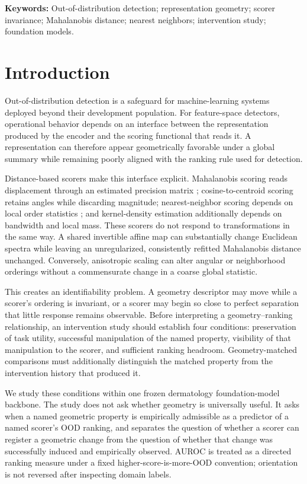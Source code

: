 \documentclass[11pt,a4paper]{article}
\begin{document}
\noindent\textbf{Keywords:} Out-of-distribution detection; representation geometry; scorer invariance; Mahalanobis distance; nearest neighbors; intervention study; foundation models.

\section{Introduction}
Out-of-distribution detection is a safeguard for machine-learning systems deployed beyond their development population. For feature-space detectors, operational behavior depends on an interface between the representation produced by the encoder and the scoring functional that reads it. A representation can therefore appear geometrically favorable under a global summary while remaining poorly aligned with the ranking rule used for detection.

Distance-based scorers make this interface explicit. Mahalanobis scoring reads displacement through an estimated precision matrix \cite{b1}; cosine-to-centroid scoring retains angles while discarding magnitude; nearest-neighbor scoring depends on local order statistics \cite{b2}; and kernel-density estimation additionally depends on bandwidth and local mass. These scorers do not respond to transformations in the same way. A shared invertible affine map can substantially change Euclidean spectra while leaving an unregularized, consistently refitted Mahalanobis distance unchanged. Conversely, anisotropic scaling can alter angular or neighborhood orderings without a commensurate change in a coarse global statistic.

This creates an identifiability problem. A geometry descriptor may move while a scorer's ordering is invariant, or a scorer may begin so close to perfect separation that little response remains observable. Before interpreting a geometry--ranking relationship, an intervention study should establish four conditions: preservation of task utility, successful manipulation of the named property, visibility of that manipulation to the scorer, and sufficient ranking headroom. Geometry-matched comparisons must additionally distinguish the matched property from the intervention history that produced it.

We study these conditions within one frozen dermatology foundation-model backbone. The study does not ask whether geometry is universally useful. It asks when a named geometric property is empirically admissible as a predictor of a named scorer's OOD ranking, and separates the question of whether a scorer can register a geometric change from the question of whether that change was successfully induced and empirically observed. AUROC is treated as a directed ranking measure \cite{b17} under a fixed higher-score-is-more-OOD convention; orientation is not reversed after inspecting domain labels.
\end{document}
